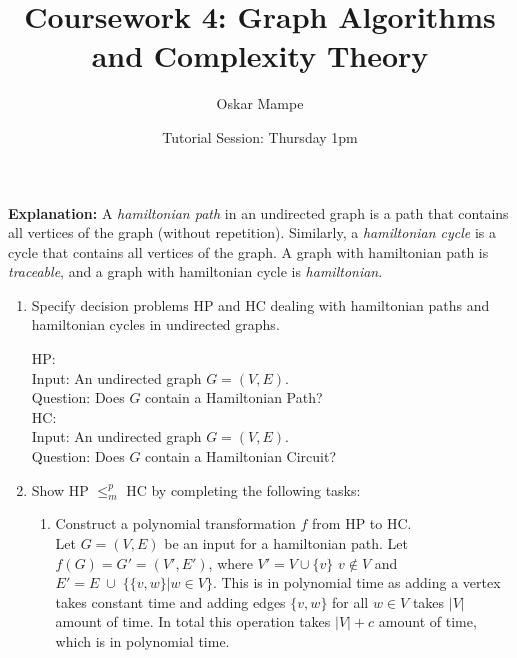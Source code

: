 \documentclass[11pt,a4paper]{article}
\title{Coursework 4: Graph Algorithms and Complexity Theory}
\author{Oskar Mampe}
\date{Tutorial Session: Thursday 1pm}
\newcommand{\hc} {HC}
\newcommand{\hp} {HP}
\begin{document}
\maketitle
\thispagestyle{empty}

\textbf{Explanation: } A \textit{hamiltonian path} in an undirected graph is a path that contains all vertices of the graph (without repetition).  Similarly, a \textit{hamiltonian cycle} is a cycle that contains all vertices of the graph.  A graph with hamiltonian path is \textit{traceable}, and a graph with hamiltonian cycle is \textit{hamiltonian}.

\begin{enumerate}
    \item Specify decision problems \hp{} and \hc{}  dealing with hamiltonian paths and hamiltonian cycles in undirected graphs.
    
    \hp{}:\\ Input: An undirected graph $G = (V, E)$.\\ Question: Does $G$ contain a Hamiltonian Path?\\


    \hc{}:\\ Input: An undirected graph $G = (V, E)$.\\ Question: Does $G$ contain a Hamiltonian Circuit?\\

    \item Show \hp{} $\leq^p_m$ \hc{} by completing the following tasks: 
        \begin{enumerate}
            \item Construct a polynomial transformation $f$ from \hp{} to \hc{}.\\
            Let $G = (V, E)$ be an input for a hamiltonian path. Let $f(G) = G'  = (V', E')$,
             where $V' = V \cup \{v\}$ $v \notin V$ and $E' = E \; \cup  \; \{ \{ v, w\} | w \in V\}$.
             This is in polynomial time as adding a vertex takes constant time and adding edges $\{v, w \}$
              for all $w \in V$ takes $|V|$ amount of time. In total this operation takes $|V| + c$ amount of time, which is in polynomial time. 
              \begin{center}
\end{center}
\end{enumerate}
\end{enumerate}
\end{document}
